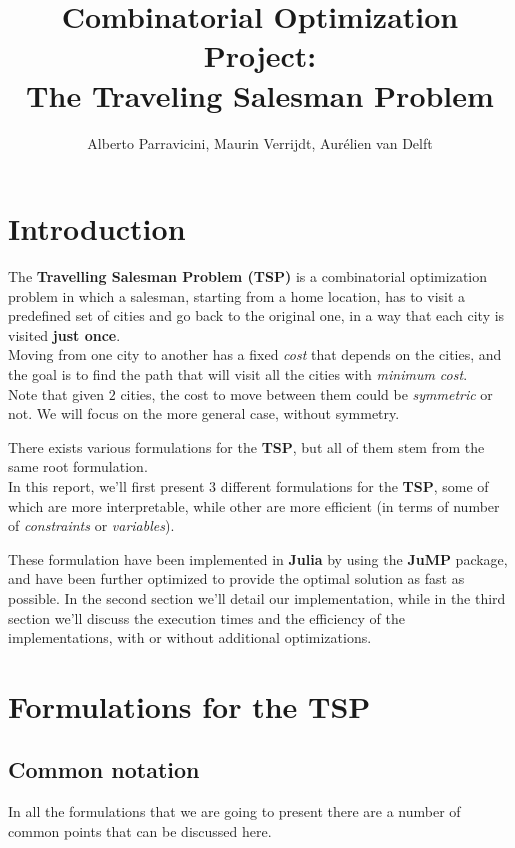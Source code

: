 \documentclass[
12pt,
a4paper,
oneside,
headinclude,
footinclude]{article}
\title{\textbf{Combinatorial Optimization Project: \\ The Traveling Salesman Problem}}
\author{{Alberto Parravicini}, {Maurin Verrijdt}, {Aurélien van Delft}}
\date{}	%
\begin{document}
    \maketitle
    \setcounter{page}{1}
    
    \section{Introduction}
    
    The \textbf{Travelling Salesman Problem (TSP)} is a combinatorial optimization problem in which a salesman, starting from a home location, has to visit a predefined set of cities and go back to the original one, in a way that each city is visited \textbf{just once}. \\
    Moving from one city to another has a fixed \textit{cost} that depends on the cities, and the goal is to find the path that will visit all the cities with \textit{minimum cost}. \\
    Note that given $2$ cities, the cost to move between them could be \textit{symmetric} or not. We will focus on the more general case, without symmetry.
    
    There exists various formulations for the \textbf{TSP}, but all of them stem from the same root formulation.\\
    In this report, we'll first present $3$ different formulations for the \textbf{TSP}, some of which are more interpretable, while other are more efficient (in terms of number of \textit{constraints} or \textit{variables}).
    
    These formulation have been implemented in \textbf{Julia} by using the \textbf{JuMP} package, and have been further optimized to provide the optimal solution as fast as possible. In the second section we'll detail our implementation, while in the third section we'll discuss the execution times and the efficiency of the implementations, with or without additional optimizations.
    
    \section{Formulations for the TSP}
    
    \subsection{Common notation}
    In all the formulations that we are going to present there are a number of common points that can be discussed here. 
    
\end{document}
